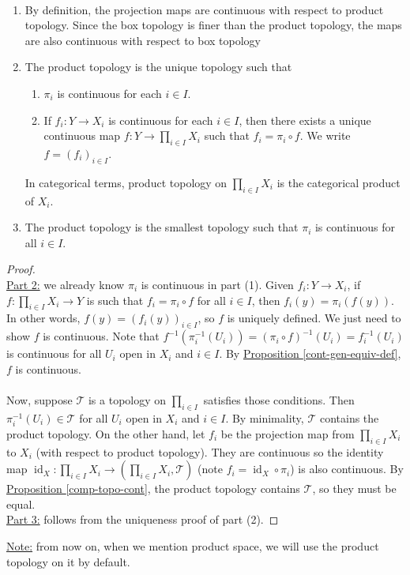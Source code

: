 \documentclass{treatise}
\begin{document}
\begin{proposition} \ 
\begin{enumerate}
    \item By definition, the projection maps are continuous with respect to product topology. Since the box topology is finer than the product topology, the maps are also continuous with respect to box topology
    \item The product topology is the unique topology such that
    \begin{enumerate}
        \item $\pi_i$ is continuous for each $i \in I$.
        \item If $f_i : Y \to X_i$ is continuous for each $i \in I$, then there exists a unique continuous map $f: Y \to \prod_{i \in I} X_i$ such that $f_i = \pi_i \circ f$. We write $f = (f_i)_{i \in I}$.
    \end{enumerate}
    In categorical terms, product topology on $\prod_{i \in I} X_i$ is the categorical product of $X_i$.
    \item The product topology is the smallest topology such that $\pi_i$ is continuous for all $i \in I$.
\end{enumerate}
\end{proposition}
\begin{proof} \ \\
\underline{Part 2:} we already know $\pi_i$ is continuous in part (1). Given $f_i: Y \to X_i$, if $f: \prod_{i \in I} X_i \to Y$ is such that $f_i = \pi_i \circ f$ for all $i \in I$, then $f_i (y) = \pi_i (f(y))$. In other words, $f(y) = (f_i(y))_{i \in I}$, so $f$ is uniquely defined. We just need to show $f$ is continuous. Note that $f^{-1}(\pi_i^{-1}(U_i)) = (\pi_i \circ f)^{-1}(U_i) = f_i^{-1}(U_i)$ is continuous for all $U_i$ open in $X_i$ and $i \in I$. By \hyperref[cont-gen-equiv-def]{Proposition \ref*{cont-gen-equiv-def}}, $f$ is continuous.
\\
\\
Now, suppose $\mathcal{T}$ is a topology on $\prod_{i \in I}$ satisfies those conditions. Then $\pi_i^{-1}(U_i) \in \mathcal{T}$ for all $U_i$ open in $X_i$ and $i \in I$. By minimality, $\mathcal{T}$ contains the product topology. On the other hand, let $f_i$ be the projection map from $\prod_{i \in I} X_i$ to $X_i$ (with respect to product topology). They are continuous so the identity map $\operatorname{id}_X : \prod_{i \in I} X_i \to (\prod_{i \in I} X_i, \mathcal{T})$ (note $f_i = \operatorname{id}_X \circ \pi_i$) is also continuous. By \hyperref[comp-topo-cont]{Proposition \ref*{comp-topo-cont}}, the product topology contains $\mathcal{T}$, so they must be equal.
\\
\underline{Part 3:} follows from the uniqueness proof of part (2).
\end{proof}
\underline{Note:} from now on, when we mention product space, we will use the product topology on it by default.
\end{document}
